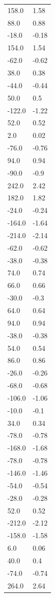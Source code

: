 \begin{longtable}{ll}
158.0 & 1.58 \\
88.0 & 0.88 \\
-18.0 & -0.18 \\
154.0 & 1.54 \\
-62.0 & -0.62 \\
38.0 & 0.38 \\
-44.0 & -0.44 \\
50.0 & 0.5 \\
-122.0 & -1.22 \\
52.0 & 0.52 \\
2.0 & 0.02 \\
-76.0 & -0.76 \\
94.0 & 0.94 \\
-90.0 & -0.9 \\
242.0 & 2.42 \\
182.0 & 1.82 \\
-24.0 & -0.24 \\
-164.0 & -1.64 \\
-214.0 & -2.14 \\
-62.0 & -0.62 \\
-38.0 & -0.38 \\
74.0 & 0.74 \\
66.0 & 0.66 \\
-30.0 & -0.3 \\
64.0 & 0.64 \\
94.0 & 0.94 \\
-38.0 & -0.38 \\
54.0 & 0.54 \\
86.0 & 0.86 \\
-26.0 & -0.26 \\
-68.0 & -0.68 \\
-106.0 & -1.06 \\
-10.0 & -0.1 \\
34.0 & 0.34 \\
-78.0 & -0.78 \\
-168.0 & -1.68 \\
-78.0 & -0.78 \\
-146.0 & -1.46 \\
-54.0 & -0.54 \\
-28.0 & -0.28 \\
52.0 & 0.52 \\
-212.0 & -2.12 \\
-158.0 & -1.58 \\
6.0 & 0.06 \\
40.0 & 0.4 \\
-74.0 & -0.74 \\
264.0 & 2.64 \\

\end{longtable}
